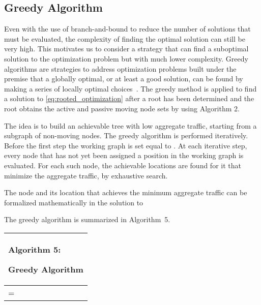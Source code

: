 \documentclass[10pt,conference]{IEEEtran}
\begin{document}
\subsection{Greedy Algorithm}
\label{sec:ga}


Even with the use of branch-and-bound to reduce the number of
solutions that must be evaluated, the complexity of finding the
optimal solution can still be very high.  This motivates us to
consider a strategy that can find a suboptimal solution to the
optimization problem but with much lower complexity.  Greedy
algorithms are strategies to address optimization problems built under
the premise that a globally optimal, or at least a good solution, can
be found by making a series of locally optimal
choices~\cite{CLRbook,Gutin}.  The greedy method is applied to find a
solution to \eqref{eq:rooted_optimization} after a root has been
determined and the root obtains the active and passive moving node
sets by using Algorithm 2.

The idea is to build an achievable tree with low aggregate traffic,
starting from a subgraph  of non-moving nodes.  The
greedy algorithm is performed iteratively.  Before the first step the
working graph  is set equal to .  At each
iterative step, every node that has not yet been assigned a position
in the working graph is evaluated.  For each such node, the achievable
locations are found for it that minimize the aggregate traffic, by
exhaustive search.


The node and its location that achieves the minimum aggregate traffic
can be formalized mathematically in the solution to

The greedy algorithm is summarized in Algorithm~5.

\begin{algorithm}[t]

\begin{tabular}[c]{p{8cm}}


\hline
{\scriptsize \begin{bf}Algorithm 5: \end{bf} Greedy Algorithm }\\
\hline

{\scriptsize
\KwIn{
Non-moving node subgraph, ; active moving node set \AM;
    initial graph 
}

\SetKwFunction{AN}{AttachNode}
\SetKwFunction{AT}{AggregateTraffic}

 = \;

\While{}{
  \;
  \ForEach{} {

\ForEach{}{

 = \AN{}\;
 \AT{}\;

\If{}
{
  \;
  \;
  \;
}


 }

 }

 = \AN{}\;
 \;

}

}
\\
\hline


\end{tabular}

\end{algorithm}
\end{document}
